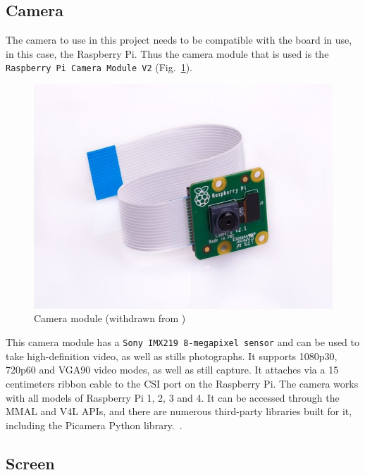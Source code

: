 \subsection{Camera}
The camera to use in this project needs to be compatible with the board in use, in this case, the Raspberry Pi.
Thus the camera module that is used is the \texttt{Raspberry Pi Camera Module V2} (Fig.~\ref{fig:camera-module}).
%
\begin{figure}[htb!]
\centering
    \includegraphics[width=0.6\columnwidth]{./img/camera-module.jpg}
  \caption{Camera module (withdrawn from \cite{camera-module})}%
\label{fig:camera-module}
\end{figure}

This camera module has a \texttt{Sony IMX219 8-megapixel sensor} and can be used to take high-definition video, as well as stills photographs. It supports 1080p30, 720p60 and VGA90 video modes, as well as still capture. It attaches via a 15 centimeters ribbon cable to the CSI port on the Raspberry Pi. The camera works with all models of Raspberry Pi 1, 2, 3 and 4. It can be accessed through the MMAL and V4L APIs, and there are numerous third-party libraries built for it, including the Picamera Python library.~\cite{camera-module}.

\subsection{Screen}


